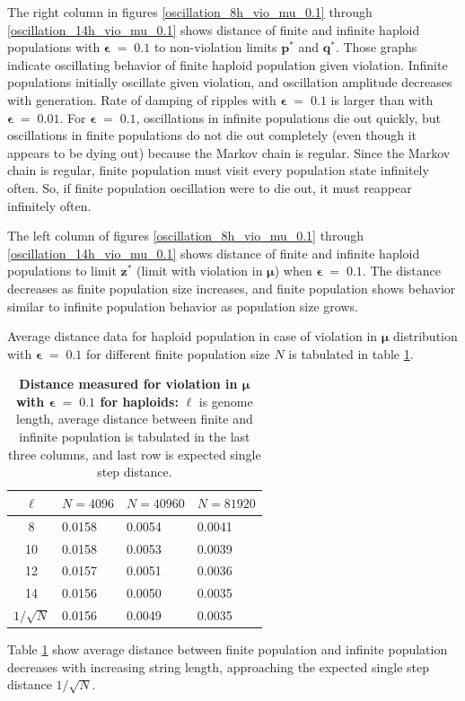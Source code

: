 The right column in figures \ref{oscillation_8h_vio_mu_0.1} through \ref{oscillation_14h_vio_mu_0.1} 
shows distance of finite and infinite haploid populations with $\bm{\epsilon} \;=\; 0.1$ to non-violation limits $\bm{p^\ast}$ and $\bm{q^\ast}$. 
Those graphs indicate oscillating behavior of finite haploid population given violation. 
Infinite populations initially oscillate given violation, and oscillation amplitude decreases with generation. 
Rate of damping of ripples with $\bm{\epsilon} \;=\; 0.1$ is  
larger than with $\bm{\epsilon} \;=\; 0.01$.
For $\bm{\epsilon} \;=\; 0.1$, oscillations in infinite populations die out quickly, 
but oscillations in finite populations do not die out completely (even though it appears to be dying out) 
because the Markov chain is regular. Since the Markov chain is regular, finite population must visit every population state infinitely often. 
So, if finite population oscillation were to die out, 
it must reappear infinitely often.

The left column of figures \ref{oscillation_8h_vio_mu_0.1} through \ref{oscillation_14h_vio_mu_0.1} 
shows distance of finite and infinite haploid populations to limit $\bm{z^\ast}$ 
(limit with violation in $\bm{\mu}$) when $\bm{\epsilon} \;=\; 0.1$. 
The distance decreases as finite population size increases, 
and finite population shows behavior similar to infinite population behavior as population size grows. 

\clearpage
Average distance data for haploid population in case of violation in $\bm{\mu}$ distribution 
with $\bm{\epsilon} \;=\; 0.1$ for different finite population size $N$ is tabulated in table \ref{distanceMuHapEps0.1}.
\begin{table}[ht]
\caption[\textbf{Distance measured for violation in $\bm{\mu}$ with $\bm{\epsilon} \;=\; 0.1$ for haploids}]{\textbf{Distance measured for violation in $\bm{\mu}$ with $\bm{\epsilon} \;=\; 0.1$ for haploids:} $\ell$ is genome length, 
average distance between finite and infinite population is tabulated in the last three columns, and last row is expected single step distance.}
\centering
\begin{tabularx}{0.75\textwidth}{ c *{3}{X}}
\toprule
$\ell$ & $N = 4096$ & $N = 40960$ & $N = 81920$ \\
\midrule
8 & 0.0158	& 0.0054 	& 0.0041 \\
10 & 0.0158	& 0.0053 	& 0.0039 \\	
12 & 0.0157	& 0.0051 	& 0.0036 \\	
14 & 0.0156	& 0.0050 	& 0.0035 \\
\midrule
$1/\sqrt{N}$ & 0.0156 & 0.0049 & 0.0035 \\
\bottomrule
\end{tabularx}
\label{distanceMuHapEps0.1}
\end{table}

Table \ref{distanceMuHapEps0.1} show average distance 
between finite population and infinite population decreases with increasing string length, 
approaching the expected single step distance $1/\sqrt{N}$. 
